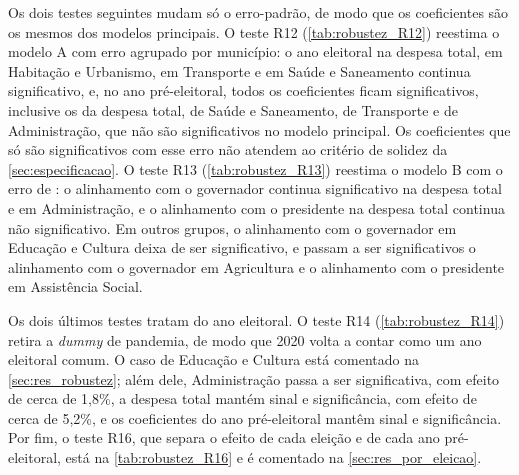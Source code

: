 Os dois testes seguintes mudam só o erro-padrão, de modo que os coeficientes são os mesmos dos modelos principais. O teste R12 (\autoref{tab:robustez_R12}) reestima o modelo A com erro agrupado por município: o ano eleitoral na despesa total, em Habitação e Urbanismo, em Transporte e em Saúde e Saneamento continua significativo, e, no ano pré-eleitoral, todos os coeficientes ficam significativos, inclusive os da despesa total, de Saúde e Saneamento, de Transporte e de Administração, que não são significativos no modelo principal. Os coeficientes que só são significativos com esse erro não atendem ao critério de solidez da \autoref{sec:especificacao}. O teste R13 (\autoref{tab:robustez_R13}) reestima o modelo B com o erro de \textcite{driscoll1998}: o alinhamento com o governador continua significativo na despesa total e em Administração, e o alinhamento com o presidente na despesa total continua não significativo. Em outros grupos, o alinhamento com o governador em Educação e Cultura deixa de ser significativo, e passam a ser significativos o alinhamento com o governador em Agricultura e o alinhamento com o presidente em Assistência Social.

Os dois últimos testes tratam do ano eleitoral. O teste R14 (\autoref{tab:robustez_R14}) retira a \textit{dummy} de pandemia, de modo que 2020 volta a contar como um ano eleitoral comum. O caso de Educação e Cultura está comentado na \autoref{sec:res_robustez}; além dele, Administração passa a ser significativa, com efeito de cerca de 1,8\%, a despesa total mantém sinal e significância, com efeito de cerca de 5,2\%, e os coeficientes do ano pré-eleitoral mantêm sinal e significância. Por fim, o teste R16, que separa o efeito de cada eleição e de cada ano pré-eleitoral, está na \autoref{tab:robustez_R16} e é comentado na \autoref{sec:res_por_eleicao}.









\clearpage


\clearpage







